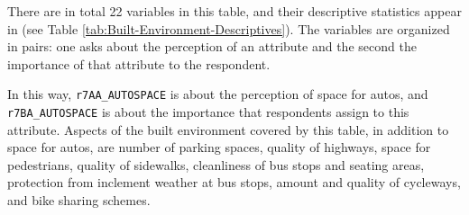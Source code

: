 \documentclass[
11pt, %
oneside, %
english, %
singlespacing, %
]{macthesis} %
\begin{document}
There are in total 22 variables in this table, and their descriptive statistics appear in (see Table \ref{tab:Built-Environment-Descriptives}). The variables are organized in pairs: one asks about the perception of an attribute and the second the importance of that attribute to the respondent.

In this way, \texttt{r7AA\_AUTOSPACE} is about the perception of space for autos, and \texttt{r7BA\_AUTOSPACE} is about the importance that respondents assign to this attribute. Aspects of the built environment covered by this table, in addition to space for autos, are number of parking spaces, quality of highways, space for pedestrians, quality of sidewalks, cleanliness of bus stops and seating areas, protection from inclement weather at bus stops, amount and quality of cycleways, and bike sharing schemes.
\end{document}

